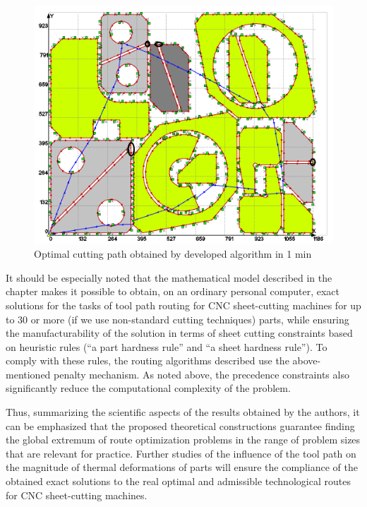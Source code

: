 \begin{figure}
  \centering
  \includegraphics[width=120mm]{Fig4-20.png}
  \caption{Optimal cutting path obtained by developed algorithm in 1 min}
  \label{fig:4}
\end{figure}


It should be especially noted
that the mathematical model described in the chapter
makes it possible to obtain,
on an ordinary personal computer,
exact solutions for the tasks of tool path routing for CNC sheet-cutting machines for up to 30 or more (if we use non-standard cutting techniques) parts, while ensuring the manufacturability of the solution in terms of sheet cutting constraints based on heuristic rules (``a part hardness rule'' and ``a sheet hardness rule''). To comply with these rules, the routing algorithms described use the above-mentioned penalty mechanism. As noted above, the precedence constraints also significantly reduce the computational complexity of the problem.

Thus, summarizing the scientific aspects of the results obtained by the authors,
it can be emphasized that the proposed
theoretical constructions guarantee finding the global extremum of route optimization problems
in the range of problem sizes that are relevant for practice.
Further studies of the influence of the tool path on
the magnitude of thermal deformations of parts will ensure the compliance of the obtained exact solutions
to the real optimal and admissible technological routes for CNC sheet-cutting machines.



